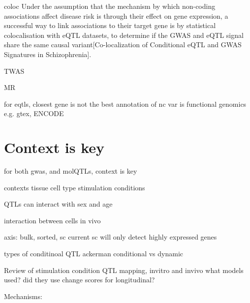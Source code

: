     coloc
        Under the assumption that the mechanism by which non-coding associations affect disease risk is through their effect on gene expression, a successful way to link associations to their target gene is by statistical colocalisation with eQTL datasets, to determine if the GWAS and eQTL signal share the same causal variant[Co-localization of Conditional eQTL and GWAS Signatures in Schizophrenia].

    TWAS

    MR

for eqtls, closest gene is not the best
    annotation of nc var is functional genomics
        e.g. gtex, ENCODE

\section{Context is key}

for both gwas, and molQTLs, context is key

contexts
    tissue
    cell type
    stimulation conditions

    QTLs can interact with sex and age

    interaction between cells in vivo

    axis:
        bulk, sorted, sc
            current sc will only detect highly expressed genes

types of conditinoal QTL
    ackerman conditional vs dynamic

Review of stimulation condition QTL mapping, invitro and invivo
what models used? did they use change scores for longitudinal?

Mechanisms: 

